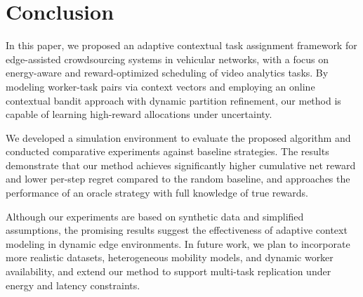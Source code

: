 \section{Conclusion}

In this paper, we proposed an adaptive contextual task assignment framework for edge-assisted crowdsourcing systems in vehicular networks, with a focus on energy-aware and reward-optimized scheduling of video analytics tasks. By modeling worker-task pairs via context vectors and employing an online contextual bandit approach with dynamic partition refinement, our method is capable of learning high-reward allocations under uncertainty.

We developed a simulation environment to evaluate the proposed algorithm and conducted comparative experiments against baseline strategies. The results demonstrate that our method achieves significantly higher cumulative net reward and lower per-step regret compared to the random baseline, and approaches the performance of an oracle strategy with full knowledge of true rewards.

Although our experiments are based on synthetic data and simplified assumptions, the promising results suggest the effectiveness of adaptive context modeling in dynamic edge environments. In future work, we plan to incorporate more realistic datasets, heterogeneous mobility models, and dynamic worker availability, and extend our method to support multi-task replication under energy and latency constraints.
